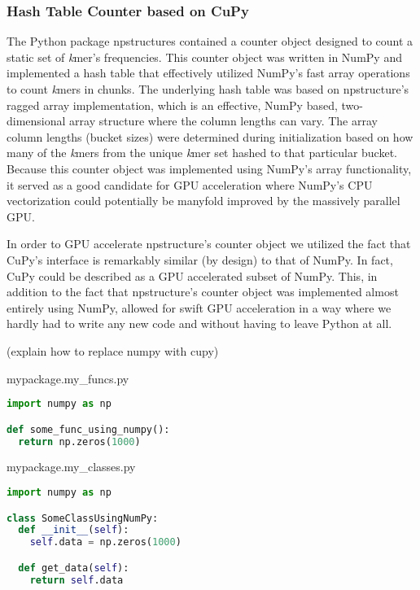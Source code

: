 \subsubsection{Hash Table Counter based on CuPy}
The Python package npstructures \cite{npstructures} contained a counter object designed to count a static set of \textit{k}mer's frequencies.
This counter object was written in NumPy and implemented a hash table that effectively utilized NumPy's fast array operations to count \textit{k}mers in chunks.
The underlying hash table was based on npstructure's ragged array implementation, which is an effective, NumPy based, two-dimensional array structure where the column lengths can vary.
The array column lengths (bucket sizes) were determined during initialization based on how many of the \textit{k}mers from the unique \textit{k}mer set hashed to that particular bucket.
Because this counter object was implemented using NumPy's array functionality, it served as a good candidate for GPU acceleration where NumPy's CPU vectorization could potentially be manyfold improved by the massively parallel GPU.

In order to GPU accelerate npstructure's counter object we utilized the fact that CuPy's interface is remarkably similar (by design) to that of NumPy.
In fact, CuPy could be described as a GPU accelerated subset of NumPy.
This, in addition to the fact that npstructure's counter object was implemented almost entirely using NumPy, allowed for swift GPU acceleration in a way where we hardly had to write any new code and without having to leave Python at all.


(explain how to replace numpy with cupy)
\begin{center}
mypackage.my\_funcs.py
\end{center}
\begin{lstlisting}[language=Python,style=pycode]
import numpy as np

def some_func_using_numpy():
  return np.zeros(1000)
\end{lstlisting}

\begin{center}
mypackage.my\_classes.py
\end{center}
\begin{lstlisting}[language=Python,style=pycode]
import numpy as np

class SomeClassUsingNumPy:
  def __init__(self):
    self.data = np.zeros(1000)

  def get_data(self):
    return self.data
\end{lstlisting}

